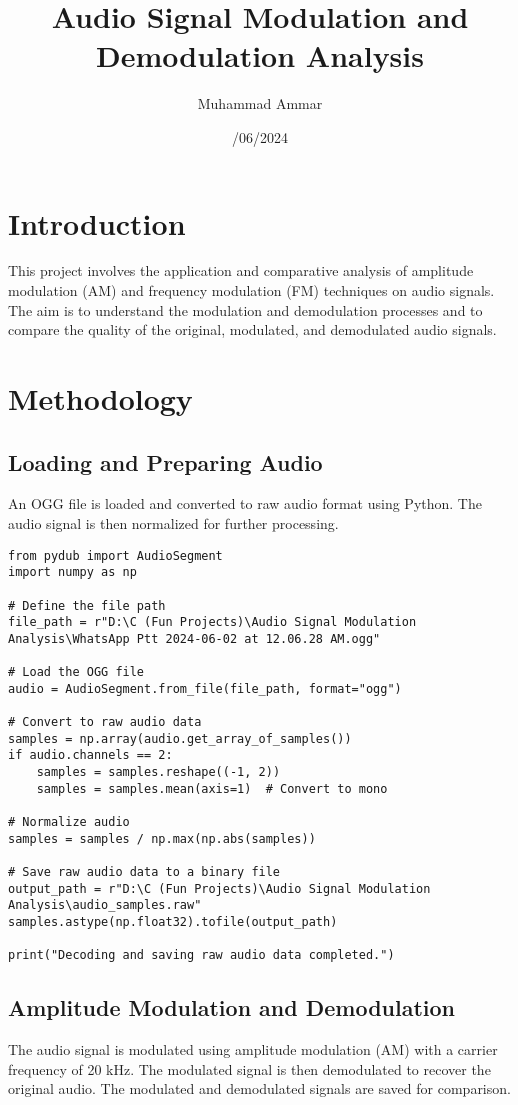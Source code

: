 \documentclass{article}
\title{Audio Signal Modulation and Demodulation Analysis}
\author{Muhammad Ammar}
\date{\02/06/2024}
\begin{document}
\maketitle

\section{Introduction}
This project involves the application and comparative analysis of amplitude modulation (AM) and frequency modulation (FM) techniques on audio signals. The aim is to understand the modulation and demodulation processes and to compare the quality of the original, modulated, and demodulated audio signals.

\section{Methodology}

\subsection{Loading and Preparing Audio}
An OGG file is loaded and converted to raw audio format using Python. The audio signal is then normalized for further processing.

\begin{verbatim}
from pydub import AudioSegment
import numpy as np

# Define the file path
file_path = r"D:\C (Fun Projects)\Audio Signal Modulation Analysis\WhatsApp Ptt 2024-06-02 at 12.06.28 AM.ogg"

# Load the OGG file
audio = AudioSegment.from_file(file_path, format="ogg")

# Convert to raw audio data
samples = np.array(audio.get_array_of_samples())
if audio.channels == 2:
    samples = samples.reshape((-1, 2))
    samples = samples.mean(axis=1)  # Convert to mono

# Normalize audio
samples = samples / np.max(np.abs(samples))

# Save raw audio data to a binary file
output_path = r"D:\C (Fun Projects)\Audio Signal Modulation Analysis\audio_samples.raw"
samples.astype(np.float32).tofile(output_path)

print("Decoding and saving raw audio data completed.")
\end{verbatim}

\subsection{Amplitude Modulation and Demodulation}
The audio signal is modulated using amplitude modulation (AM) with a carrier frequency of 20 kHz. The modulated signal is then demodulated to recover the original audio. The modulated and demodulated signals are saved for comparison.
\end{document}
